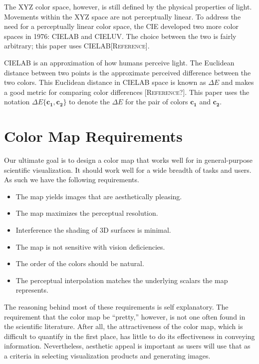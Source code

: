 \documentclass[twocolumn]{article}
\newcommand{\sticky}[1]{\textsc{[#1]}}
\newcommand{\XYZ}{XYZ\xspace}
\newcommand{\Lab}{CIELAB\xspace}
\newcommand{\Luv}{CIELUV\xspace}
\newcommand{\DeltaE}{\ensuremath{\Delta{}E}\xspace}
\newcommand*{\cvec}[1]{\mathbf{#1}}
\begin{document}
The \XYZ color space, however, is still defined by the physical properties
of light.  Movements within the \XYZ space are not perceptually linear.  To
address the need for a perceptually linear color space, the CIE developed
two more color spaces in 1976: \Lab and \Luv.  The choice between the two
is fairly arbitrary; this paper uses \Lab \sticky{Reference}.

\Lab is an approximation of how humans perceive light.  The Euclidean
distance between two points is the approximate perceived difference between
the two colors.  This Euclidean distance in \Lab space is known as \DeltaE
and makes a good metric for comparing color differences
\sticky{Reference?}.  This paper uses the notation
$\DeltaE\{\cvec{c_1},\cvec{c_2}\}$ to denote the \DeltaE for the pair of
colors $\cvec{c_1}$ and $\cvec{c_2}$.


\section{Color Map Requirements}
\label{sec:ColorMapRequirements}

Our ultimate goal is to design a color map that works well for in
general-purpose scientific visualization.  It should work well for a wide
breadth of tasks and users.  As such we have the following requirements.

\begin{itemize}
\item The map yields images that are aesthetically pleasing.
\item The map maximizes the perceptual resolution.
\item Interference the shading of 3D surfaces is minimal.
\item The map is not sensitive with vision deficiencies.
\item The order of the colors should be natural.
\item The perceptual interpolation matches the underlying scalars the map
  represents.
\end{itemize}

The reasoning behind most of these requirements is self explanatory.  The
requirement that the color map be ``pretty,'' however, is not one often
found in the scientific literature.  After all, the attractiveness of the
color map, which is difficult to quantify in the first place, has little to
do its effectiveness in conveying information.  Nevertheless, aesthetic
appeal is important as users will use that as a criteria in selecting
visualization products and generating images.
\end{document}
